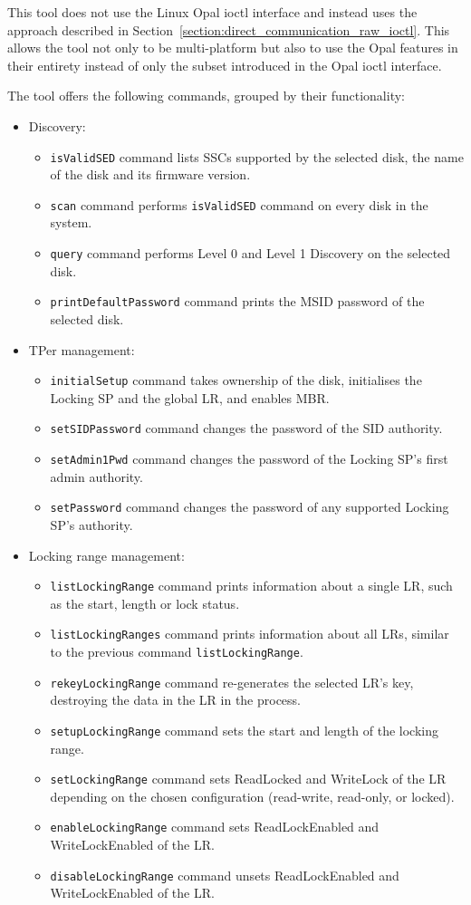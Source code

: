 This tool does not use the Linux Opal ioctl interface and instead uses the approach described in Section~\ref{section:direct_communication_raw_ioctl}. This allows the tool not only to be multi-platform but also to use the Opal features in their entirety instead of only the subset introduced in the Opal ioctl interface.


The tool offers the following commands, grouped by their functionality:
\begin{itemize}
    \item Discovery: \begin{itemize}
\item \verb|isValidSED| command lists SSCs supported by the selected disk, the name of the disk and its firmware version.
\item \verb|scan| command performs \verb|isValidSED| command on every disk in the system.
\item \verb|query| command performs Level 0 and Level 1 Discovery on the selected disk.
\item \verb|printDefaultPassword| command prints the MSID password of the selected disk.
    \end{itemize}
    
    \item TPer management: \begin{itemize}
\item \verb|initialSetup| command takes ownership of the disk, initialises the Locking SP and the global LR, and enables MBR.
\item \verb|setSIDPassword| command changes the password of the SID authority.
\item \verb|setAdmin1Pwd| command changes the password of the Locking SP's first admin authority. 
\item \verb|setPassword| command changes the password of any supported Locking SP's authority.
    \end{itemize}
    
    \item Locking range management: \begin{itemize}
\item \verb|listLockingRange| command prints information about a single LR, such as the start, length or lock status.
\item \verb|listLockingRanges| command prints information about all LRs, similar to the previous command \verb|listLockingRange|.
\item \verb|rekeyLockingRange| command re-generates the selected LR's key, destroying the data in the LR in the process.
\item \verb|setupLockingRange| command sets the start and length of the locking range.
\item \verb|setLockingRange| command sets ReadLocked and WriteLock of the LR depending on the chosen configuration (read-write, read-only, or locked).
\item \verb|enableLockingRange| command sets ReadLockEnabled and WriteLockEnabled of the LR. 
\item \verb|disableLockingRange| command unsets ReadLockEnabled and WriteLockEnabled of the LR. 
    \end{itemize}
    

\end{itemize}
